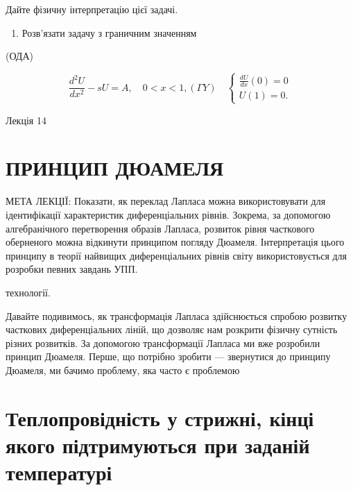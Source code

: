 \documentclass[
  ukrainian,
]{article}
\providecommand{\tightlist}{%
  \setlength{\itemsep}{0pt}\setlength{\parskip}{0pt}}
\begin{document}
Дайте фізичну інтерпретацію цієї задачі.

\begin{enumerate}
\def\labelenumi{\arabic{enumi}.}
\setcounter{enumi}{3}
\tightlist
\item
  Розв'язати задачу з граничним значенням
\end{enumerate}

(ОДА)

\[
\frac{d^2U}{dx^2} - sU = A, \quad 0 < x < 1,
(\Gamma Y) \quad
\begin{cases} \frac{dU}{dx} (0) = 0 \\ U(1) = 0. \end{cases}
\]

Лекція 14

\section{ПРИНЦИП
ДЮАМЕЛЯ}\label{ux43fux440ux438ux43dux446ux438ux43f-ux434ux44eux430ux43cux435ux43bux44f}

МЕТА ЛЕКЦІЇ: Показати, як переклад Лапласа можна використовувати для
ідентифікації характеристик диференціальних рівнів. Зокрема, за
допомогою алгебранічного перетворення образів Лапласа, розвиток рівня
часткового оберненого можна відкинути принципом погляду Дюамеля.
Інтерпретація цього принципу в теорії найвищих диференціальних рівнів
світу використовується для розробки певних завдань УПП.

технології.

Давайте подивимось, як трансформація Лапласа здійснюється спробою
розвитку часткових диференціальних ліній, що дозволяє нам розкрити
фізичну сутність різних розвитків. За допомогою трансформації Лапласа ми
вже розробили принцип Дюамеля. Перше, що потрібно зробити --- звернутися
до принципу Дюамеля, ми бачимо проблему, яка часто є проблемою

\section{Теплопровідність у стрижні, кінці якого підтримуються при
заданій
температурі}\label{ux442ux435ux43fux43bux43eux43fux440ux43eux432ux456ux434ux43dux456ux441ux442ux44c-ux443-ux441ux442ux440ux438ux436ux43dux456-ux43aux456ux43dux446ux456-ux44fux43aux43eux433ux43e-ux43fux456ux434ux442ux440ux438ux43cux443ux44eux442ux44cux441ux44f-ux43fux440ux438-ux437ux430ux434ux430ux43dux456ux439-ux442ux435ux43cux43fux435ux440ux430ux442ux443ux440ux456}
\end{document}
